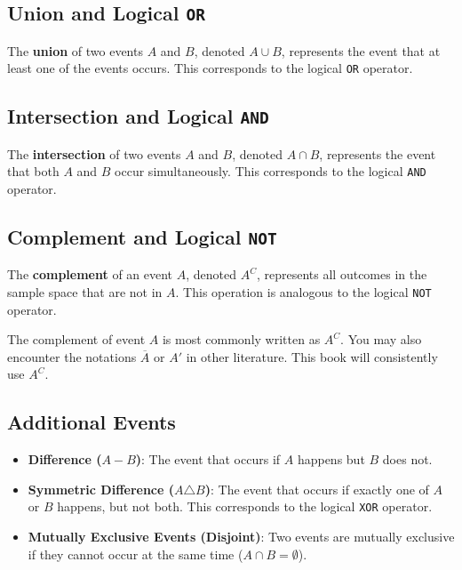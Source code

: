 \subsection*{Union and Logical \texttt{OR}}
The \textbf{union} of two events \( A \) and \( B \), denoted $A \cup B$, represents the event that at least one of the events occurs. This corresponds to the logical \texttt{OR} operator.

\subsection*{Intersection and Logical \texttt{AND}}
The \textbf{intersection} of two events \( A \) and \( B \), denoted $A \cap B$, represents the event that both \( A \) and \( B \) occur simultaneously. This corresponds to the logical \texttt{AND} operator.

\subsection*{Complement and Logical \texttt{NOT}}
The \textbf{complement} of an event \( A \), denoted $A^C$, represents all outcomes in the sample space that are not in \( A \). This operation is analogous to the logical \texttt{NOT} operator.

\begin{remark}
    The complement of event $A$ is most commonly written as $A^C$. You may also encounter the notations $\overline{A}$ or $A'$ in other literature. This book will consistently use $A^C$.
\end{remark}

\subsection*{Additional Events}
\begin{itemize}
    \item \textbf{Difference (\( A - B \))}: The event that occurs if \( A \) happens but \( B \) does not.
    \item \textbf{Symmetric Difference (\( A \triangle B \))}: The event that occurs if exactly one of \( A \) or \( B \) happens, but not both. This corresponds to the logical \texttt{XOR} operator.
    \item \textbf{Mutually Exclusive Events (Disjoint)}: Two events are mutually exclusive if they cannot occur at the same time ($A \cap B = \emptyset$).
\end{itemize}

